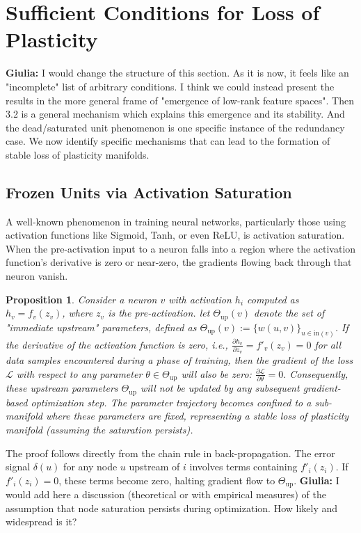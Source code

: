 \documentclass{article}
\newcommand{\Loss}{\mathcal{L}}
\newcommand{\giulia}[1]{{\color{ForestGreen}\textbf{Giulia:} #1}}
\newtheorem{proposition}{Proposition}[section]
\begin{document}
\section{Sufficient Conditions for Loss of Plasticity}
\label{sec:frozen}
\giulia{I would change the structure of this section. As it is now, it feels like an "incomplete" list of arbitrary conditions. I think we could instead present the results in the more general frame of "emergence of low-rank feature spaces". Then 3.2 is a general mechanism which explains this emergence and its stability. And the dead/saturated unit phenomenon is one specific instance of the redundancy case.}
We now identify specific mechanisms that can lead to the formation of stable loss of plasticity manifolds. 

\subsection{Frozen Units via Activation Saturation}

A well-known phenomenon in training neural networks, particularly those using activation functions like Sigmoid, Tanh, or even ReLU, is activation saturation. When the pre-activation input to a neuron falls into a region where the activation function's derivative is zero or near-zero, the gradients flowing back through that neuron vanish. 

\begin{proposition}
\label{prop:saturated}
Consider a neuron $v$ with activation $h_i$ computed as $h_v = f_v(z_v)$, where $z_v$ is the pre-activation. let $\Theta_{\text{up}}(v)$ denote the set of "immediate upstream" parameters, defined as ${\Theta_{\text{up}}(v):=\{w(u,v)\}_{u\in \text{in}(v)}}$. If the derivative of the activation function is zero, i.e.,
\(
\frac{\partial h_v}{\partial z_v} = f'_v(z_v) = 0
\)
for all data samples encountered during a phase of training, then the gradient of the loss $\Loss$ with respect to any parameter $\theta \in \Theta_{\text{up}}$ will also be zero:
\(
\frac{\partial\Loss}{\partial\theta} = 0.
\)
Consequently, these upstream parameters $\Theta_{\text{up}}$ will not be updated by any subsequent gradient-based optimization step.  The parameter trajectory becomes confined to a sub-manifold where these parameters are fixed, representing a stable loss of plasticity manifold (assuming the saturation persists).
\end{proposition}

The proof follows directly from the chain rule in back-propagation. The error signal $\delta(u)$ for any node $u$ upstream of $i$ involves terms containing $f'_i(z_i)$. If $f'_i(z_i)=0$, these terms become zero, halting gradient flow to $\Theta_{\text{up}}$. \giulia{I would add here a discussion (theoretical or with empirical measures) of the assumption that node saturation persists during optimization. How likely and widespread is it?}
\end{document}
